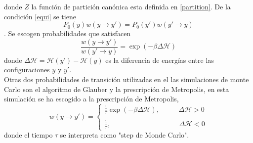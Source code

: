 \documentclass[a4paper]{article}
\begin{document}
donde $Z$ la función de partición canónica esta definida en \ref{partition}. De la condición \ref{equi} se tiene
\begin{equation}
P_0(y)w(y\rightarrow y')=P_0(y')w(y'\rightarrow y)
\end{equation}.
Se escogen probabilidades  que satisfacen 
\begin{equation}\label{probTans1}
\frac{w(y\rightarrow y')}{w(y'\rightarrow y)}=\exp (-\beta \Delta \mathcal{H})
\end{equation}
donde $\Delta\mathcal{H}=\mathcal{H}(y')-\mathcal{H}(y)$ es la diferencia de energías entre las configuraciones $y$ y $y'$.\\
Otras dos probabilidades de transición utilizadas en el las simulaciones de monte Carlo son el algoritmo de Glauber y la prescripción de Metropolis, en esta simulación se ha escogido a la prescripción de Metropolis,
\begin{equation}
w(y\rightarrow y')=\left\{
        \begin{array}{ll}
            \frac{1}{\tau}\exp (-\beta \Delta \mathcal{H}), & \quad\;\,\,\,\, \Delta\mathcal{H}> 0 \\\\
            \frac{1}{\tau}, & \quad\quad \Delta\mathcal{H}< 0
        \end{array}
    \right.
\end{equation}
donde el tiempo $\tau$ se interpreta como "step de Monde Carlo".%
\end{document}
